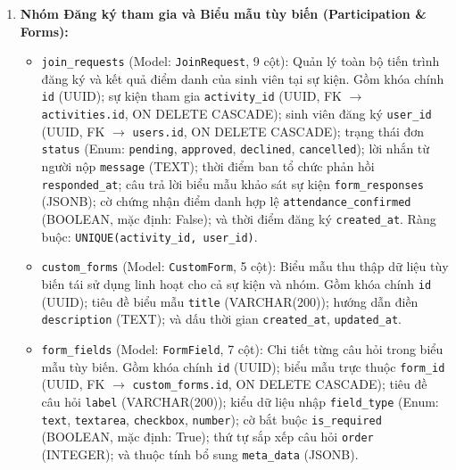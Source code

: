 \begin{enumerate}
    \item \textbf{Nhóm Đăng ký tham gia và Biểu mẫu tùy biến (Participation \& Forms):}
    \begin{itemize}
        \item \texttt{join\_requests} (Model: \texttt{JoinRequest}, 9 cột): Quản lý toàn bộ tiến trình đăng ký và kết quả điểm danh của sinh viên tại sự kiện. Gồm khóa chính \texttt{id} (UUID); sự kiện tham gia \texttt{activity\_id} (UUID, FK $\rightarrow$ \texttt{activities.id}, ON DELETE CASCADE); sinh viên đăng ký \texttt{user\_id} (UUID, FK $\rightarrow$ \texttt{users.id}, ON DELETE CASCADE); trạng thái đơn \texttt{status} (Enum: \texttt{pending}, \texttt{approved}, \texttt{declined}, \texttt{cancelled}); lời nhắn từ người nộp \texttt{message} (TEXT); thời điểm ban tổ chức phản hồi \texttt{responded\_at}; câu trả lời biểu mẫu khảo sát sự kiện \texttt{form\_responses} (JSONB); cờ chứng nhận điểm danh hợp lệ \texttt{attendance\_confirmed} (BOOLEAN, mặc định: False); và thời điểm đăng ký \texttt{created\_at}. Ràng buộc: \texttt{UNIQUE(activity\_id, user\_id)}.
        \item \texttt{custom\_forms} (Model: \texttt{CustomForm}, 5 cột): Biểu mẫu thu thập dữ liệu tùy biến tái sử dụng linh hoạt cho cả sự kiện và nhóm. Gồm khóa chính \texttt{id} (UUID); tiêu đề biểu mẫu \texttt{title} (VARCHAR(200)); hướng dẫn điền \texttt{description} (TEXT); và dấu thời gian \texttt{created\_at}, \texttt{updated\_at}.
        \item \texttt{form\_fields} (Model: \texttt{FormField}, 7 cột): Chi tiết từng câu hỏi trong biểu mẫu tùy biến. Gồm khóa chính \texttt{id} (UUID); biểu mẫu trực thuộc \texttt{form\_id} (UUID, FK $\rightarrow$ \texttt{custom\_forms.id}, ON DELETE CASCADE); tiêu đề câu hỏi \texttt{label} (VARCHAR(200)); kiểu dữ liệu nhập \texttt{field\_type} (Enum: \texttt{text}, \texttt{textarea}, \texttt{checkbox}, \texttt{number}); cờ bắt buộc \texttt{is\_required} (BOOLEAN, mặc định: True); thứ tự sắp xếp câu hỏi \texttt{order} (INTEGER); và thuộc tính bổ sung \texttt{meta\_data} (JSONB).
    \end{itemize}


\end{enumerate}
